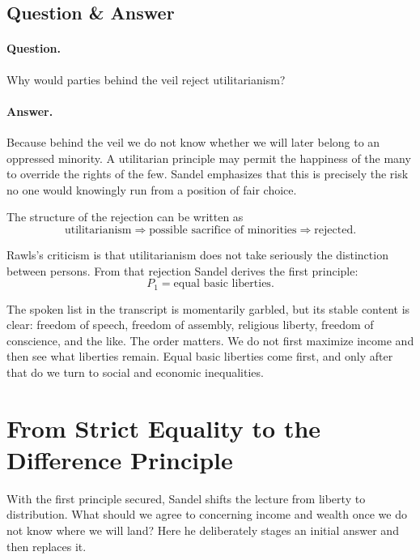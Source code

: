 \subsection{Question \& Answer}

\paragraph{Question.} Why would parties behind the veil reject utilitarianism?

\paragraph{Answer.} Because behind the veil we do not know whether we will later belong to an oppressed minority. A utilitarian principle may permit the happiness of the many to override the rights of the few. Sandel emphasizes that this is precisely the risk no one would knowingly run from a position of fair choice.

The structure of the rejection can be written as
\begin{equation}
\text{utilitarianism}
\Longrightarrow
\text{possible sacrifice of minorities}
\Longrightarrow
\text{rejected}.
\end{equation}

Rawls's criticism is that utilitarianism does not take seriously the distinction between persons. From that rejection Sandel derives the first principle:
\begin{equation}
P_1=\text{equal basic liberties}.
\end{equation}

The spoken list in the transcript is momentarily garbled, but its stable content is clear: freedom of speech, freedom of assembly, religious liberty, freedom of conscience, and the like. The order matters. We do not first maximize income and then see what liberties remain. Equal basic liberties come first, and only after that do we turn to social and economic inequalities.

\section{From Strict Equality to the Difference Principle}

With the first principle secured, Sandel shifts the lecture from liberty to distribution. What should we agree to concerning income and wealth once we do not know where we will land? Here he deliberately stages an initial answer and then replaces it.

